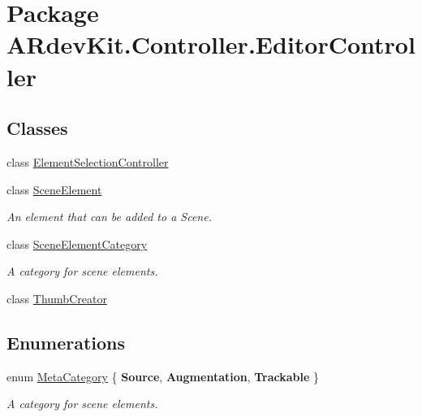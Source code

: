 \hypertarget{namespace_a_rdev_kit_1_1_controller_1_1_editor_controller}{\section{Package A\-Rdev\-Kit.\-Controller.\-Editor\-Controller}
\label{namespace_a_rdev_kit_1_1_controller_1_1_editor_controller}
}
\subsection*{Classes}
\begin{DoxyCompactItemize}
\item 
class \hyperlink{class_a_rdev_kit_1_1_controller_1_1_editor_controller_1_1_element_selection_controller}{Element\-Selection\-Controller}
\item 
class \hyperlink{class_a_rdev_kit_1_1_controller_1_1_editor_controller_1_1_scene_element}{Scene\-Element}
\begin{DoxyCompactList}\small\item\em An element that can be added to a Scene. \end{DoxyCompactList}\item 
class \hyperlink{class_a_rdev_kit_1_1_controller_1_1_editor_controller_1_1_scene_element_category}{Scene\-Element\-Category}
\begin{DoxyCompactList}\small\item\em A category for scene elements. \end{DoxyCompactList}\item 
class \hyperlink{class_a_rdev_kit_1_1_controller_1_1_editor_controller_1_1_thumb_creator}{Thumb\-Creator}
\end{DoxyCompactItemize}
\subsection*{Enumerations}
\begin{DoxyCompactItemize}
\item 
enum \hyperlink{namespace_a_rdev_kit_1_1_controller_1_1_editor_controller_a304367964b3f3f5c115bb81e7b31d534}{Meta\-Category} \{ {\bfseries Source}, 
{\bfseries Augmentation}, 
{\bfseries Trackable}
 \}
\begin{DoxyCompactList}\small\item\em A category for scene elements. \end{DoxyCompactList}\end{DoxyCompactItemize}


